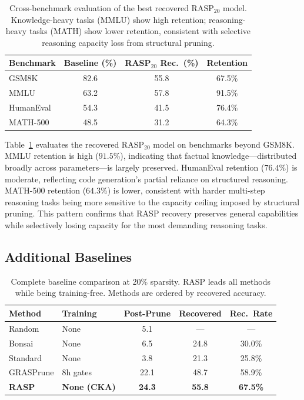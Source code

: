 \documentclass[11pt,a4paper]{article}
\begin{document}
\begin{table}[t]
\centering
\small
\begin{tabular}{@{}lccc@{}}
\toprule
\textbf{Benchmark} & \textbf{Baseline (\%)} & \textbf{RASP$_{20}$ Rec.\ (\%)} & \textbf{Retention} \\
\midrule
GSM8K & 82.6 & 55.8 & 67.5\% \\
MMLU & 63.2 & 57.8 & 91.5\% \\
HumanEval & 54.3 & 41.5 & 76.4\% \\
MATH-500 & 48.5 & 31.2 & 64.3\% \\
\bottomrule
\end{tabular}
\caption{Cross-benchmark evaluation of the best recovered RASP$_{20}$ model. Knowledge-heavy tasks (MMLU) show high retention; reasoning-heavy tasks (MATH) show lower retention, consistent with selective reasoning capacity loss from structural pruning.}
\label{tab:crossbench}
\end{table}

Table~\ref{tab:crossbench} evaluates the recovered RASP$_{20}$ model on benchmarks beyond GSM8K. MMLU retention is high ($91.5$\%), indicating that factual knowledge---distributed broadly across parameters---is largely preserved. HumanEval retention ($76.4$\%) is moderate, reflecting code generation's partial reliance on structured reasoning. MATH-500 retention ($64.3$\%) is lower, consistent with harder multi-step reasoning tasks being more sensitive to the capacity ceiling imposed by structural pruning. This pattern confirms that RASP recovery preserves general capabilities while selectively losing capacity for the most demanding reasoning tasks.

\subsection{Additional Baselines}

\begin{table}[t]
\centering
\small
\begin{tabular}{@{}llccc@{}}
\toprule
\textbf{Method} & \textbf{Training} & \textbf{Post-Prune} & \textbf{Recovered} & \textbf{Rec.\ Rate} \\
\midrule
Random & None & 5.1 & --- & --- \\
Bonsai & None & 6.5 & 24.8 & 30.0\% \\
Standard & None & 3.8 & 21.3 & 25.8\% \\
GRASPrune & 8h gates & 22.1 & 48.7 & 58.9\% \\
\textbf{RASP} & \textbf{None (CKA)} & \textbf{24.3} & \textbf{55.8} & \textbf{67.5\%} \\
\bottomrule
\end{tabular}
\caption{Complete baseline comparison at 20\% sparsity. RASP leads all methods while being training-free. Methods are ordered by recovered accuracy.}
\label{tab:baselines}
\end{table}
\end{document}
